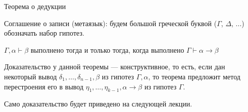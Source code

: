 \documentclass[aspectratio=169]{beamer}
\begin{document}
\begin{frame}{Теорема о дедукции}

Соглашение о записи (метаязык): будем большой греческой буквой ($\Gamma$, $\Delta$, ...) обозначать
набор гипотез.

\begin{theorem}
$\Gamma,\alpha\vdash\beta$ выполнено тогда и только тогда, когда выполнено $\Gamma\vdash\alpha\rightarrow\beta$
\end{theorem}

\vspace{0.5cm}
Доказательство у данной теоремы --- конструктивное, то есть, если дан некоторый вывод
$\delta_1, \dots, \delta_{n-1}, \beta$ из гипотез $\Gamma,\alpha$, то теорема предложит метод
перестроения его в вывод $\eta_1, \dots, \eta_{k-1}, \alpha\rightarrow\beta$ из гипотез $\Gamma$.

Само доказательство будет приведено на следующей лекции.
\end{frame}
\end{document}
